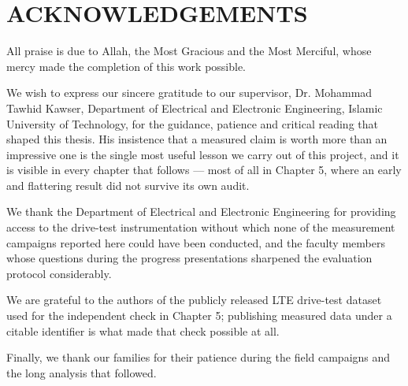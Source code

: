 \chapter*{ACKNOWLEDGEMENTS}

All praise is due to Allah, the Most Gracious and the Most Merciful, whose mercy made the completion of this work possible.

We wish to express our sincere gratitude to our supervisor, Dr. Mohammad Tawhid Kawser, Department of Electrical and Electronic Engineering, Islamic University of Technology, for the guidance, patience and critical reading that shaped this thesis. His insistence that a measured claim is worth more than an impressive one is the single most useful lesson we carry out of this project, and it is visible in every chapter that follows --- most of all in Chapter 5, where an early and flattering result did not survive its own audit.

We thank the Department of Electrical and Electronic Engineering for providing access to the drive-test instrumentation without which none of the measurement campaigns reported here could have been conducted, and the faculty members whose questions during the progress presentations sharpened the evaluation protocol considerably.

We are grateful to the authors of the publicly released LTE drive-test dataset used for the independent check in Chapter 5; publishing measured data under a citable identifier is what made that check possible at all.

Finally, we thank our families for their patience during the field campaigns and the long analysis that followed.

